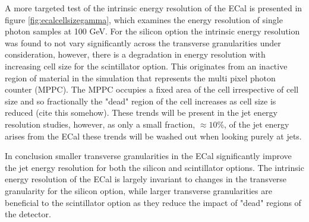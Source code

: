 A more targeted test of the intrinsic energy resolution of the ECal is presented in figure \ref{fig:ecalcellsizegamma}, which examines the energy resolution of single photon samples at 100 GeV.  For the silicon option the intrinsic energy resolution was found to not vary significantly across the transverse granularities under consideration, however, there is a degradation in energy resolution with increasing cell size for the scintillator option.  This originates from an inactive region of material in the simulation that represents the multi pixel photon counter (MPPC).  The MPPC occupies a fixed area of the cell irrespective of cell size and so fractionally the "dead" region of the cell increases as cell size is reduced (cite this somehow).  These trends will be present in the jet energy resolution studies, however, as only a small fraction, $\approx 10$\%, of the jet energy arises from the ECal these trends will be washed out when looking purely at jets.

In conclusion smaller transverse granularities in the ECal significantly improve the jet energy resolution for both the silicon and scintillator options.  The intrinsic energy resolution of the ECal is largely invariant to changes in the transverse granularity for the silicon option, while larger transverse granularities are beneficial to the scintillator option as they reduce the impact of "dead" regions of the detector.  


